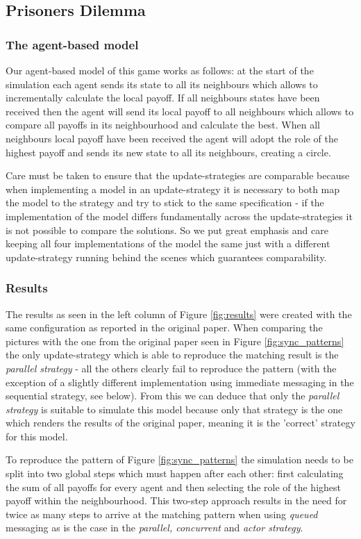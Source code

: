 \subsection{Prisoners Dilemma}
\subsubsection{The agent-based model}
Our agent-based model of this game works as follows: at the start of the simulation each agent sends its state to all its neighbours which allows to incrementally calculate the local payoff. If all neighbours states have been received then the agent will send its local payoff to all neighbours which allows to compare all payoffs in its neighbourhood and calculate the best. When all neighbours local payoff have been received the agent will adopt the role of the highest payoff and sends its new state to all its neighbours, creating a circle. 

Care must be taken to ensure that the update-strategies are comparable because when implementing a model in an update-strategy it is necessary to both map the model to the strategy and try to stick to the same specification - if the implementation of the model differs fundamentally across the update-strategies it is not possible to compare the solutions. So we put great emphasis and care keeping all four implementations of the model the same just with a different update-strategy running behind the scenes which guarantees comparability.

\subsubsection{Results}
The results as seen in the left column of Figure \ref{fig:results} were created with the same configuration as reported in the original paper. When comparing the pictures with the one from the original paper seen in Figure \ref{fig:sync_patterns} the only update-strategy which is able to reproduce the matching result is the \textit{parallel strategy} - all the others clearly fail to reproduce the pattern (with the exception of a slightly different implementation using immediate messaging in the sequential strategy, see below). From this we can deduce that only the \textit{parallel strategy} is suitable to simulate this model because only that strategy is the one which renders the results of the original paper, meaning it is the 'correct' strategy for this model. 

To reproduce the pattern of Figure \ref{fig:sync_patterns} the simulation needs to be split into two global steps which must happen after each other: first calculating the sum of all payoffs for every agent and then selecting the role of the highest payoff within the neighbourhood. This two-step approach results in the need for twice as many steps to arrive at the matching pattern when using \textit{queued} messaging as is the case in the \textit{parallel, concurrent} and \textit{actor strategy}.

